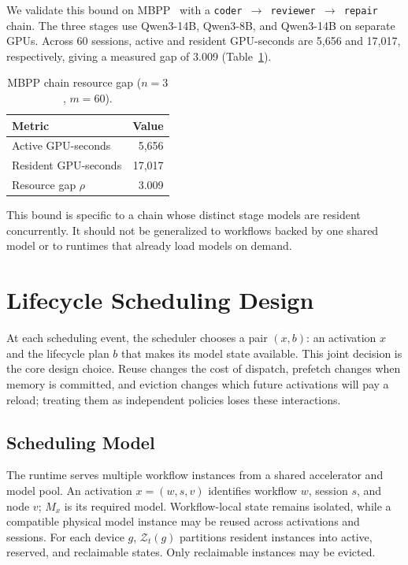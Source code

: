 \documentclass{article}
\begin{document}
We validate this bound on MBPP~\cite{austin2021program} with a
\texttt{coder $\rightarrow$ reviewer $\rightarrow$ repair} chain. The three
stages use Qwen3-14B, Qwen3-8B, and Qwen3-14B on separate GPUs. Across 60
sessions, active and resident GPU-seconds are 5,656 and 17,017, respectively,
giving a measured gap of 3.009 (Table~\ref{tab:mbpp_empirical}).

\begin{table}[htbp]
    \centering
    \caption{MBPP chain resource gap ($n=3$, $m=60$).}
    \label{tab:mbpp_empirical}
    \begin{tabular}{lr}
        \toprule
        Metric & Value \\
        \midrule
        Active GPU-seconds & 5,656 \\
        Resident GPU-seconds & 17,017 \\
        Resource gap $\rho$ & 3.009 \\
        \bottomrule
    \end{tabular}
\end{table}

This bound is specific to a chain whose distinct stage models are resident
concurrently. It should not be generalized to workflows backed by one shared
model or to runtimes that already load models on demand.

\section{Lifecycle Scheduling Design}
\label{sec:lifecycle-scheduling-design}

At each scheduling event, the scheduler chooses a pair $(x,b)$: an activation
$x$ and the lifecycle plan $b$ that makes its model state available. This joint
decision is the core design choice. Reuse changes the cost of dispatch,
prefetch changes when memory is committed, and eviction changes which future
activations will pay a reload; treating them as independent policies loses
these interactions.

\subsection{Scheduling Model}

The runtime serves multiple workflow instances from a shared accelerator and
model pool. An activation $x=(w,s,v)$ identifies workflow $w$, session $s$, and
node $v$; $M_x$ is its required model. Workflow-local state remains isolated,
while a compatible physical model instance may be reused across activations and
sessions. For each device $g$, $\mathcal{Z}_t(g)$ partitions resident instances
into active, reserved, and reclaimable states. Only reclaimable instances may be
evicted.
\end{document}
